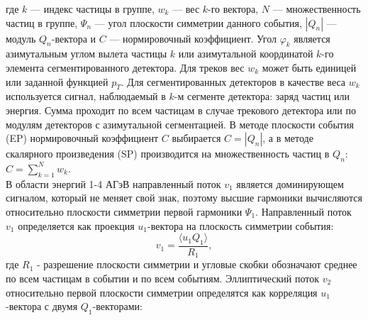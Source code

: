 где $k$ --- индекс частицы в группе, $w_k$ --- вес $k$-го вектора, $N$ --- множественность частиц в группе, $\Psi_n$ --- угол плоскости симметрии данного события, $|Q_n|$ ---
модуль $Q_n$-вектора и $C$ --- нормировочный коэффициент.  Угол $\varphi_k$ является азимутальным углом вылета частицы $k$ или азимутальной координатой $k$-го
элемента сегментированного детектора. Для треков  вес $w_k$  может быть единицей или заданной функцией $p_T$. Для сегментированных детекторов в качестве
веса $w_k$ используется сигнал, наблюдаемый в $k$-м сегменте детектора: заряд частиц или энергия.
Сумма проходит по всем частицам  в случае трекового детектора  или по модулям детекторов с
азимутальной сегментацией. В методе плоскости события (EP) нормировочный коэффициент $C$ выбирается $C=|Q_n|$, а в методе  скалярного произведения (SP)
 производится на множественность частиц в $Q_n$:  $C=\sum_{k=1}^N w_k$. \\
 В области энергий 1-4 АГэВ направленный поток $v_1$ является доминирующем сигналом, который не меняет свой знак,  поэтому высшие гармоники вычисляются
 относительно  плоскости симметрии первой гармоники $\Psi_1$. 
 Направленный поток $v_1$ определяется как проекция $u_1$-вектора на плоскость симметрии события:
%
\begin{equation}
    v_1 =  \frac{ \langle u_1 Q_1 \rangle }{R_1},
    \label{eq:v1_formula}
\end{equation}
где $R_1$ - разрешение плоскости симметрии и угловые скобки обозначают среднее по всем частицам в событии и по всем событиям. 
Эллиптический поток $v_2$ относительно первой плоскости симметрии определятся как корреляция $u_1$-вектора   с двумя
$Q_1$-векторами:

